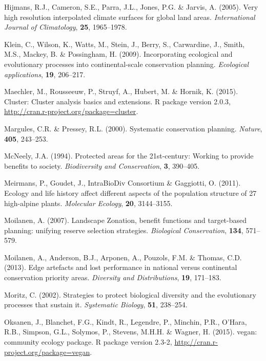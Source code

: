 \hypertarget{ref-r33}{}
Hijmans, R.J., Cameron, S.E., Parra, J.L., Jones, P.G. \& Jarvis, A.
(2005). Very high resolution interpolated climate surfaces for global
land areas. \emph{International Journal of Climatology}, \textbf{25},
1965--1978.

\hypertarget{ref-r448}{}
Klein, C., Wilson, K., Watts, M., Stein, J., Berry, S., Carwardine, J.,
Smith, M.S., Mackey, B. \& Possingham, H. (2009). Incorporating
ecological and evolutionary processes into continental-scale
conservation planning. \emph{Ecological applications}, \textbf{19},
206--217.

\hypertarget{ref-r457}{}
Maechler, M., Rousseeuw, P., Struyf, A., Hubert, M. \& Hornik, K.
(2015). Cluster: Cluster analysis basics and extensions. R package
version 2.0.3, \url{http://cran.r-project.org/package=cluster}.

\hypertarget{ref-r255}{}
Margules, C.R. \& Pressey, R.L. (2000). Systematic conservation
planning. \emph{Nature}, \textbf{405}, 243--253.

\hypertarget{ref-r423}{}
McNeely, J.A. (1994). Protected areas for the 21st-century: Working to
provide benefits to society. \emph{Biodiversity and Conservation},
\textbf{3}, 390--405.

\hypertarget{ref-r462}{}
Meirmans, P., Goudet, J., IntraBioDiv Consortium \& Gaggiotti, O.
(2011). Ecology and life history affect different aspects of the
population structure of 27 high-alpine plants. \emph{Molecular Ecology},
\textbf{20}, 3144--3155.

\hypertarget{ref-r429}{}
Moilanen, A. (2007). Landscape Zonation, benefit functions and
target-based planning: unifying reserve selection strategies.
\emph{Biological Conservation}, \textbf{134}, 571--579.

\hypertarget{ref-r483}{}
Moilanen, A., Anderson, B.J., Arponen, A., Pouzols, F.M. \& Thomas, C.D.
(2013). Edge artefacts and lost performance in national versus
continental conservation priority areas. \emph{Diversity and
Distributions}, \textbf{19}, 171--183.

\hypertarget{ref-r63}{}
Moritz, C. (2002). Strategies to protect biological diversity and the
evolutionary processes that sustain it. \emph{Systematic Biology},
\textbf{51}, 238--254.

\hypertarget{ref-r458}{}
Oksanen, J., Blanchet, F.G., Kindt, R., Legendre, P., Minchin, P.R.,
O'Hara, R.B., Simpson, G.L., Solymos, P., Stevens, M.H.H. \& Wagner, H.
(2015). vegan: community ecology package. R package version 2.3-2,
\url{http://cran.r-project.org/package=vegan}.

